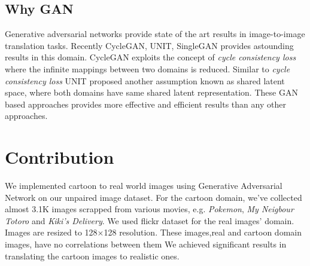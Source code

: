 \subsection{Why GAN}
Generative adversarial networks provide state of the art results in image-to-image translation tasks. Recently CycleGAN\cite{cyclegan}, UNIT\cite{DBLP:journals/corr/LiuBK17}, SingleGAN\cite{SingleGAN} provides astounding results in this domain. CycleGAN exploits the concept of \textit{cycle consistency loss} where the infinite mappings between two domains is reduced. Similar to \textit{cycle consistency loss} UNIT\cite{DBLP:journals/corr/LiuBK17} proposed another assumption known as shared latent space, where both domains have same shared latent representation. These GAN based approaches provides more effective and efficient results than any other approaches.
 
\section{Contribution}
We implemented cartoon to real world images using Generative Adversarial Network on our unpaired image dataset. For the cartoon domain, we've collected almost 3.1K images scrapped from various movies, e.g. \textit{Pokemon}, \textit{My Neigbour Totoro} and \textit{Kiki’s Delivery}. We used flickr dataset for the real images’ domain. Images are resized to 128×128 resolution. These images,real and cartoon domain images, have no correlations between them We achieved significant results in translating the cartoon images to realistic ones. 